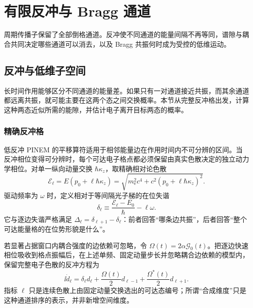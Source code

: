 \chapter{有限反冲与 Bragg 通道}\label{chap:recoil-bragg-channels}

周期传播子保留了全部倒格通道。反冲使不同通道的能量间隔不再等同，谱隙与耦合共同决定哪些通道可以消去，以及 Bragg 共振何时成为受控的低维运动。

\section{反冲与低维子空间}

长时间作用能够区分不同通道的能量差。如果只有一对通道接近共振，而其余通道都远离共振，就可能主要在这两个态之间交换概率。本节从完整反冲格出发，计算这种两态近似所需的能隙，并估计电子离开目标两态的概率。

\subsection{精确反冲格}\label{subsec:exact-recoil-lattice-dp19}

低反冲 PINEM 的平移算符适用于相邻能量边在作用时间内不可分辨的区间。当反冲相位变得可分辨时，每个可达电子格点都必须保留由真实色散决定的独立动力学相位。对单一纵向动量交换 $\hbar \kappa_z$，取精确相对论色散
\begin{equation*}
\mathcal E_\ell
=E(p_0+\ell\hbar \kappa_z)
=\sqrt{m_{\mathrm e}^2c^4+c^2(p_0+\ell\hbar \kappa_z)^2}.
\end{equation*}
驱动频率为 $\omega$ 时，定义相对于等间隔光子梯的在位失谐
\begin{equation}
{
\delta_\ell
\equiv\frac{\mathcal E_\ell-E_0}{\hbar}-\ell\omega .}
\label{eq:exact_onsite_detuning}
\end{equation}
它与逐边失谐严格满足 $\Delta_\ell=\delta_{\ell+1}-\delta_\ell$：前者回答“哪条边共振”，后者回答“整个可达能量格的在位势形貌是什么”。

若显著占据窗口内耦合强度的边依赖可忽略，令 $\Omega(t)=2\alpha\mathcal G_0(t)$。把逐边快速相位吸收到格点振幅后，在上述单频、固定动量步长并忽略耦合边依赖的模型内，保留完整电子色散的反冲方程为
\begin{equation}
{
\ii\dot d_\ell
=\delta_\ell d_\ell
+\frac{\Omega(t)}2d_{\ell-1}
+\frac{\Omega^*(t)}2d_{\ell+1}.}
\label{eq:exact_recoil_tight_binding}
\end{equation}
指标 $\ell$ 只是连续色散上由固定动量交换选出的可达态编号；所谓“合成维度”只是这种通道排序的表示，并非新增空间维度。

